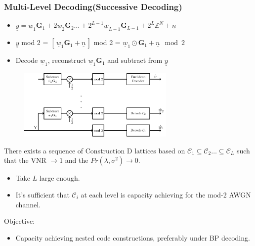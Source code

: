 \documentclass[10pt]{beamer}
\newcommand{\mc}{\mathcal}
\begin{document}
\begin{frame}\frametitle{Multi-Level Decoding(Successive Decoding) }
      \begin{itemize}
        \item $\underline{y} = \boxed{\underline{w}_1 \mathbf{G}_1 + 2 \underline{w}_2 \mathbf{G}_2 \ldots +2^{L-1} \underline{w}_{L-1} \mathbf{G}_{L-1} +2^{L}\mathbb{Z}^{N}} + \underline{n}$
         \vspace{0.05in}	
         \item $\underline{y}$ mod 2 = $ \left[\,\underline{w}_1 \mathbf{G}_1 + \underline{n}\,\right] $ mod 2 = $\underline{w}_1 \odot \mathbf{G}            _1 + \boxed{\underline{n} \mod 2}$
         \vspace{0.05in}
		\item Decode $\underline{w}_1$, reconstruct $\underline{w}_1 \mathbf{G}_1$ and subtract from $\underline{y}$
         \vspace{0.2in}
    \end{itemize}
            \begin{figure}
					\includegraphics[width=3in]{multi_stage_decode}
            \end{figure}
	\end{frame}


\begin{frame}
        \begin{theorem}
There exists a sequence of Construction D lattices based on $\mc{C}_{1}\subseteq \mc{C}_{2}\ldots \subseteq \mc{C}_{L}$ such that the VNR $\rightarrow 1$ and the $Pr(\lambda,\sigma^{2})\rightarrow 0$.
       \end{theorem}

\begin{itemize}
\item Take $L$ large enough.
\item It's sufficient that $\mc{C}_{i}$ at each level is capacity achieving for the mod-2 AWGN channel.
\end{itemize}
\pause
\vspace{0.4in}
Objective:
\begin{itemize}
\item Capacity achieving nested code constructions, preferably under BP decoding.
\end{itemize}
\end{frame}
\end{document}
